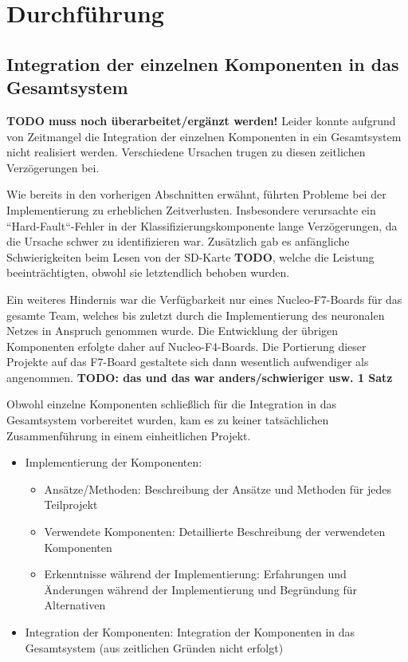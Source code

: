 \newpage
\section{Durchführung}






\subsection{Integration der einzelnen Komponenten in das Gesamtsystem}
\label{sec:no-gesamtintegration}

\textbf{TODO muss noch überarbeitet/ergänzt werden!}
Leider konnte aufgrund von Zeitmangel die Integration der einzelnen Komponenten in ein Gesamtsystem nicht realisiert werden. Verschiedene Ursachen trugen zu diesen zeitlichen Verzögerungen bei.

Wie bereits in den vorherigen Abschnitten erwähnt, führten Probleme bei der Implementierung zu erheblichen Zeitverlusten. Insbesondere verursachte ein ``Hard-Fault``-Fehler in der Klassifizierungskomponente lange Verzögerungen, da die Ursache schwer zu identifizieren war. Zusätzlich gab es anfängliche Schwierigkeiten beim Lesen von der SD-Karte \textbf{TODO}, welche die Leistung beeinträchtigten, obwohl sie letztendlich behoben wurden.

Ein weiteres Hindernis war die Verfügbarkeit nur eines Nucleo-F7-Boards für das gesamte Team, welches bis zuletzt durch die Implementierung des neuronalen Netzes in Anspruch genommen wurde. Die Entwicklung der übrigen Komponenten erfolgte daher auf Nucleo-F4-Boards. Die Portierung dieser Projekte auf das F7-Board gestaltete sich dann wesentlich aufwendiger als angenommen. \textbf{TODO: das und das war anders/schwieriger usw. 1 Satz}

Obwohl einzelne Komponenten schließlich für die Integration in das Gesamtsystem vorbereitet wurden, kam es zu keiner tatsächlichen Zusammenführung in einem einheitlichen Projekt.


\begin{itemize}

	\item Implementierung der Komponenten:
	\begin{itemize}
		\item Ansätze/Methoden: Beschreibung der Ansätze und Methoden für jedes Teilprojekt
		\item Verwendete Komponenten: Detaillierte Beschreibung der verwendeten Komponenten
		\item Erkenntnisse während der Implementierung: Erfahrungen und Änderungen während der Implementierung und Begründung für Alternativen
	\end{itemize}
	\item Integration der Komponenten: Integration der Komponenten in das Gesamtsystem (aus zeitlichen Gründen nicht erfolgt)
\end{itemize}


